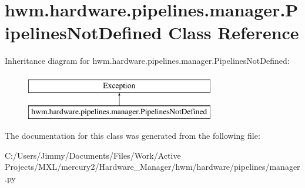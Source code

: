 \hypertarget{classhwm_1_1hardware_1_1pipelines_1_1manager_1_1_pipelines_not_defined}{\section{hwm.\-hardware.\-pipelines.\-manager.\-Pipelines\-Not\-Defined Class Reference}
\label{classhwm_1_1hardware_1_1pipelines_1_1manager_1_1_pipelines_not_defined}
}
Inheritance diagram for hwm.\-hardware.\-pipelines.\-manager.\-Pipelines\-Not\-Defined\-:\begin{figure}[H]
\begin{center}
\leavevmode
\includegraphics[height=2.000000cm]{classhwm_1_1hardware_1_1pipelines_1_1manager_1_1_pipelines_not_defined}
\end{center}
\end{figure}


The documentation for this class was generated from the following file\-:\begin{DoxyCompactItemize}
\item 
C\-:/\-Users/\-Jimmy/\-Documents/\-Files/\-Work/\-Active Projects/\-M\-X\-L/mercury2/\-Hardware\-\_\-\-Manager/hwm/hardware/pipelines/manager.\-py\end{DoxyCompactItemize}
